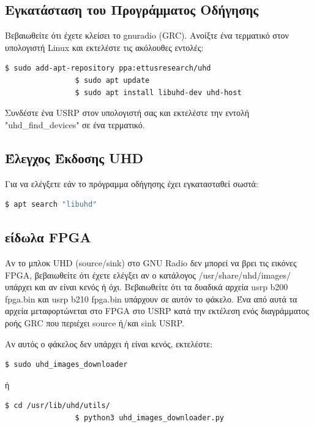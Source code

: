 \documentclass[12pt]{report}
\begin{document}
        \subsection*{\textsf{Εγκατάσταση του Προγράμματος Οδήγησης}}
            Βεβαιωθείτε ότι έχετε κλείσει το gnuradio (GRC). Ανοίξτε ένα τερματικό στον υπολογιστή
            Linux και εκτελέστε τις ακόλουθες εντολές:
            \begin{lstlisting}[language=bash]
                $ sudo add-apt-repository ppa:ettusresearch/uhd
                $ sudo apt update
                $ sudo apt install libuhd-dev uhd-host
            \end{lstlisting}
            Συνδέστε ένα USRP στον υπολογιστή σας και εκτελέστε την εντολή "uhd_find_devices" σε ένα τερματικό.
            \subsection*{\textsf{Έλεγχος Έκδοσης UHD}}
            Για να ελέγξετε εάν το πρόγραμμα οδήγησης έχει εγκατασταθεί σωστά:
            \begin{lstlisting}[language=bash]
                $ apt search "libuhd"
            \end{lstlisting}

        \subsection*{\textsf{είδωλα FPGA}}
            Αν το μπλοκ UHD (source/sink) στο GNU Radio δεν μπορεί να βρει τις εικόνες FPGA, βεβαιωθείτε
            ότι έχετε ελέγξει αν ο κατάλογος /usr/share/uhd/images/ υπάρχει και αν είναι κενός ή όχι.
            Βεβαιωθείτε ότι τα δυαδικά αρχεία usrp b200 fpga.bin και usrp b210 fpga.bin υπάρχουν σε 
            αυτόν το φάκελο. Ένα από αυτά τα αρχεία μεταφορτώνεται στο FPGA στο USRP κατά την εκτέλεση
            ενός διαγράμματος ροής GRC που περιέχει source ή/και sink USRP.

            Αν αυτός ο φάκελος δεν υπάρχει ή είναι κενός, εκτελέστε:
            \begin{lstlisting}[language=bash]
                $ sudo uhd_images_downloader
            \end{lstlisting}
            ή
            \begin{lstlisting}[language=bash]
                $ cd /usr/lib/uhd/utils/
                $ python3 uhd_images_downloader.py
            \end{lstlisting}
\end{document}
